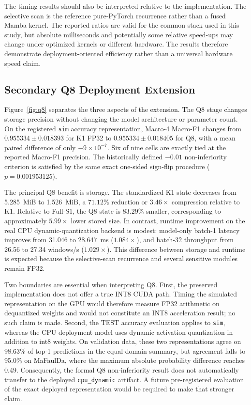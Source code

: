 The timing results should also be interpreted relative to the implementation. The selective scan is the reference pure-PyTorch recurrence rather than a fused Mamba kernel. The reported ratios are valid for the common stack used in this study, but absolute milliseconds and potentially some relative speed-ups may change under optimized kernels or different hardware. The results therefore demonstrate deployment-oriented efficiency rather than a universal hardware speed claim.

\subsection{Secondary Q8 Deployment Extension}
\label{subsec:q8_results}




Figure~\ref{fig:q8} separates the three aspects of the extension. The Q8 stage changes storage precision without changing the model architecture or parameter count. On the registered \texttt{sim} accuracy representation, Macro-4 Macro-F1 changes from $0.955334\pm0.018393$ for K1 FP32 to $0.955334\pm0.018405$ for Q8, with a mean paired difference of only $-9\times10^{-7}$. Six of nine cells are exactly tied at the reported Macro-F1 precision. The historically defined $-0.01$ non-inferiority criterion is satisfied by the same exact one-sided sign-flip procedure ($p=0.001953125$).

The principal Q8 benefit is storage. The standardized K1 state decreases from 5.285~MiB to 1.526~MiB, a $71.12\%$ reduction or $3.46\times$ compression relative to K1. Relative to Full-S1, the Q8 state is $83.29\%$ smaller, corresponding to approximately $5.99\times$ lower stored size. In contrast, runtime improvement on the real CPU dynamic-quantization backend is modest: model-only batch-1 latency improves from 31.046 to 28.647~ms ($1.084\times$), and batch-32 throughput from 26.56 to 27.34 windows/s ($1.029\times$). This difference between storage and runtime is expected because the selective-scan recurrence and several sensitive modules remain FP32.

Two boundaries are essential when interpreting Q8. First, the preserved implementation does not offer a true INT8 CUDA path. Timing the simulated representation on the GPU would therefore measure FP32 arithmetic on dequantized weights and would not constitute an INT8 acceleration result; no such claim is made. Second, the TEST accuracy evaluation applies to \texttt{sim}, whereas the CPU deployment model uses dynamic activation quantization in addition to int8 weights. On validation data, these two representations agree on 98.63\% of top-1 predictions in the equal-domain summary, but agreement falls to 95.0\% on MaFaulDa, where the maximum absolute probability difference reaches 0.49. Consequently, the formal Q8 non-inferiority result does not automatically transfer to the deployed \texttt{cpu\_dynamic} artifact. A future pre-registered evaluation of the exact deployed representation would be required to make that stronger claim.

